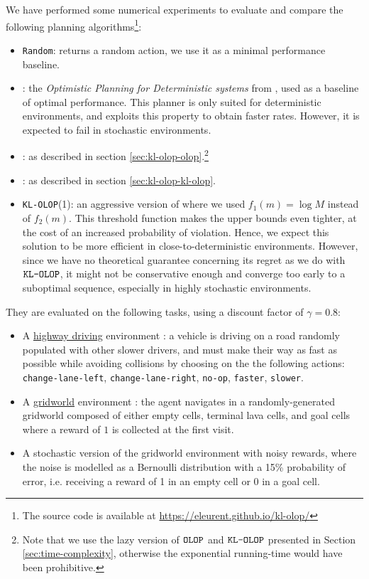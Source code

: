 \documentclass[runningheads, envcountsame, a4paper]{llncs}
\newcommand{\citep}{\cite}
\begin{document}
We have performed some numerical experiments to evaluate and compare the following planning algorithms\footnote[1]{The source code is available at \url{https://eleurent.github.io/kl-olop/}}:
\begin{itemize}
    \item \texttt{Random}: returns a random action, we use it as a minimal performance baseline.
    \item \OPD: the \emph{Optimistic Planning for Deterministic systems} from \citep{Hren2008}, used as a baseline of optimal performance. This planner is only suited for deterministic environments, and exploits this property to obtain faster rates. However, it is expected to fail in stochastic environments.
    \item \OLOP: as described in section \ref{sec:kl-olop-olop}.\footnote[2]{Note that we use the lazy version of $\texttt{OLOP}$ and $\texttt{KL-OLOP}$ presented in Section \ref{sec:time-complexity}, otherwise the exponential running-time would have been prohibitive.}
    \item \KLOLOP: as described in section \ref{sec:kl-olop-kl-olop}.\footnotemark[2]
    \item \texttt{KL-OLOP}(1): an aggressive version of \KLOLOP where we used $f_1(m) = \log M$ instead of $f_2(m)$. This threshold function makes the upper bounds even tighter, at the cost of an increased probability of violation. Hence, we expect this solution to be more efficient in close-to-deterministic environments. However, since we have no theoretical guarantee concerning its regret as we do with $\texttt{KL-OLOP}$, it might not be conservative enough and converge too early to a suboptimal sequence, especially in highly stochastic environments.
\end{itemize}

They are evaluated on the following tasks, using a discount factor of $\gamma=0.8$:
\begin{itemize}
    \item A \href{https://github.com/eleurent/highway-env/}{highway driving} environment \citep{highway-env}: a vehicle is driving on a road randomly populated with other slower drivers, and must make their way as fast as possible while avoiding collisions by choosing on the the following actions: \texttt{change-lane-left}, \texttt{change-lane-right}, \texttt{no-op}, \texttt{faster}, \texttt{slower}.
    \item A \href{https://github.com/maximecb/gym-minigrid}{gridworld} environment \citep{gym_minigrid}: the agent navigates in a randomly-generated gridworld composed of either empty cells, terminal lava cells, and goal cells where a reward of $1$ is collected at the first visit.
    \item A stochastic version of the gridworld environment with noisy rewards, where the noise is modelled as a Bernoulli distribution with a 15\% probability of error, i.e. receiving a reward of 1 in an empty cell or 0 in a goal cell.
\end{itemize}
\end{document}
